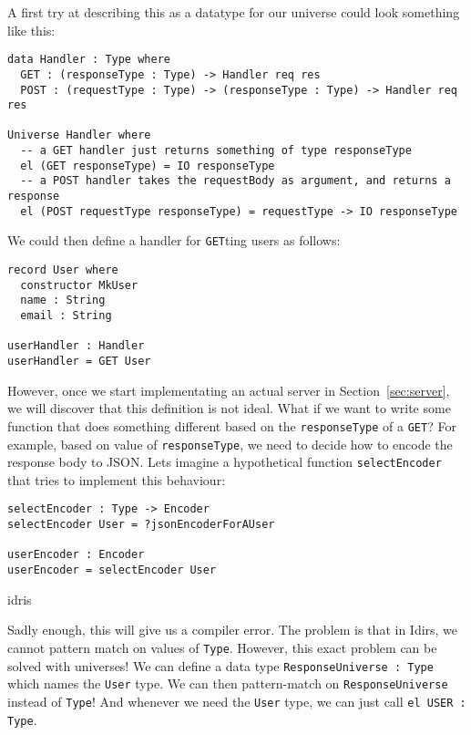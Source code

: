 \documentclass[12pt,a4paper]{article}
\begin{document}
A first try at describing this as a datatype for our universe  could look something like this:
\begin{listing}
  \begin{verbatim}
data Handler : Type where
  GET : (responseType : Type) -> Handler req res
  POST : (requestType : Type) -> (responseType : Type) -> Handler req res

Universe Handler where
  -- a GET handler just returns something of type responseType
  el (GET responseType) = IO responseType
  -- a POST handler takes the requestBody as argument, and returns a response
  el (POST requestType responseType) = requestType -> IO responseType

  \end{verbatim}
\end{listing}

We could then define a handler for \texttt{GET}ting users as follows:
\begin{verbatim}
record User where
  constructor MkUser
  name : String
  email : String

userHandler : Handler
userHandler = GET User
\end{verbatim}

However, once we start implementating an actual server in Section~\ref{sec:server}, we will discover that this definition is not ideal. What if we want to write some
function that does something different based on the \texttt{responseType} of a \texttt{GET}?
For example, based on value of \texttt{responseType}, we need to decide how to encode the response body to JSON. Lets imagine a hypothetical function \texttt{selectEncoder} that tries to implement this behaviour:

\begin{verbatim}
selectEncoder : Type -> Encoder
selectEncoder User = ?jsonEncoderForAUser

userEncoder : Encoder
userEncoder = selectEncoder User
\end{verbatim}{idris}

Sadly enough, this will give us a compiler error. The problem is that in Idirs, we cannot pattern match on values of \texttt{Type}. 
However, this exact problem can be solved with universes! We can define a data type \texttt{ResponseUniverse : Type} which names
the \texttt{User} type. We can then pattern-match on \texttt{ResponseUniverse} instead of \texttt{Type}!
And whenever we need the \texttt{User} type, we can just call \texttt{el USER : Type}.
\end{document}
